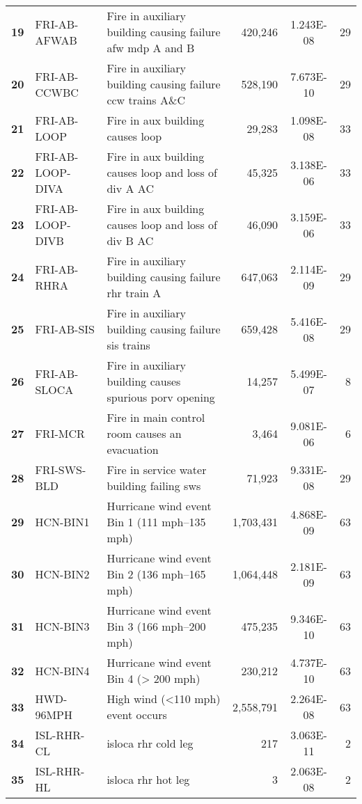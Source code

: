 \begin{longtable}{@{}lllrSr@{}}
\textbf{19} & FRI-AB-AFWAB     & Fire in auxiliary building causing failure \acrshort{afw} \acrshort{mdp} A and B & 420,246   & 1.243E-08 & 29 \\
\textbf{20} & FRI-AB-CCWBC     & Fire in auxiliary building causing failure \acrshort{ccw} trains A\&C & 528,190   & 7.673E-10 & 29 \\
\textbf{21} & FRI-AB-LOOP      & Fire in aux building causes \acrshort{loop} & 29,283    & 1.098E-08 & 33 \\
\textbf{22} & FRI-AB-LOOP-DIVA & Fire in aux building causes \acrshort{loop} and loss of div A AC & 45,325    & 3.138E-06 & 33 \\
\textbf{23} & FRI-AB-LOOP-DIVB & Fire in aux building causes \acrshort{loop} and loss of div B AC & 46,090    & 3.159E-06 & 33 \\
\textbf{24} & FRI-AB-RHRA      & Fire in auxiliary building causing failure \acrshort{rhr} train A & 647,063   & 2.114E-09 & 29 \\
\textbf{25} & FRI-AB-SIS       & Fire in auxiliary building causing failure \acrshort{sis} trains & 659,428   & 5.416E-08 & 29 \\
\textbf{26} & FRI-AB-SLOCA     & Fire in auxiliary building causes spurious \acrshort{porv} opening & 14,257    & 5.499E-07 & 8  \\
\textbf{27} & FRI-MCR          & Fire in main control room causes an evacuation & 3,464     & 9.081E-06 & 6  \\
\textbf{28} & FRI-SWS-BLD      & Fire in service water building failing \acrshort{sws} & 71,923    & 9.331E-08 & 29 \\
\textbf{29} & HCN-BIN1         & Hurricane wind event Bin 1 (111 mph--135 mph) & 1,703,431 & 4.868E-09 & 63 \\
\textbf{30} & HCN-BIN2         & Hurricane wind event Bin 2 (136 mph--165 mph) & 1,064,448 & 2.181E-09 & 63 \\
\textbf{31} & HCN-BIN3         & Hurricane wind event Bin 3 (166 mph--200 mph) & 475,235   & 9.346E-10 & 63 \\
\textbf{32} & HCN-BIN4         & Hurricane wind event Bin 4 (> 200 mph) & 230,212   & 4.737E-10 & 63 \\
\textbf{33} & HWD-96MPH        & High wind (<110 mph) event occurs & 2,558,791 & 2.264E-08 & 63 \\
\textbf{34} & ISL-RHR-CL       & \acrshort{isloca} \acrshort{rhr} cold leg & 217       & 3.063E-11 & 2  \\
\textbf{35} & ISL-RHR-HL       & \acrshort{isloca} \acrshort{rhr} hot leg & 3         & 2.063E-08 & 2  \\

\end{longtable}
